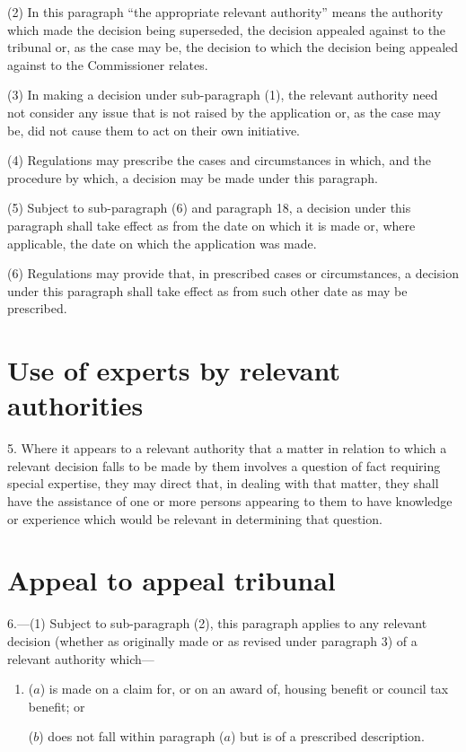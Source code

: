 \documentclass[12pt,a4paper]{article}
\begin{document}
(2) In this paragraph “the appropriate relevant authority” means the authority which made the decision being superseded, the decision appealed against to the tribunal or, as the case may be, the decision to which the decision being appealed against to the Commissioner relates.

(3) In making a decision under sub-paragraph (1), the relevant authority need not consider any issue that is not raised by the application or, as the case may be, did not cause them to act on their own initiative.

(4) Regulations may prescribe the cases and circumstances in which, and the procedure by which, a decision may be made under this paragraph.

(5) Subject to sub-paragraph (6)  and paragraph 18, a decision under this paragraph shall take effect as from the date on which it is made or, where applicable, the date on which the application was made.

(6) Regulations may provide that, in prescribed cases or circumstances, a decision under this paragraph shall take effect as from such other date as may be prescribed.

\section*{Use of experts by relevant authorities}

5. Where it appears to a relevant authority that a matter in relation to which a relevant decision falls to be made by them involves a question of fact requiring special expertise, they may direct that, in dealing with that matter, they shall have the assistance of one or more persons appearing to them to have knowledge or experience which would be relevant in determining that question.

\section*{Appeal to appeal tribunal}

6.---(1) Subject to sub-paragraph (2), this paragraph applies to any relevant decision (whether as originally made or as revised under paragraph 3) of a relevant authority which—
\begin{enumerate}\item[]
($a$) is made on a claim for, or on an award of, housing benefit or council tax benefit; or

($b$) does not fall within paragraph ($a$)  but is of a prescribed description.
\end{enumerate}
\end{document}
